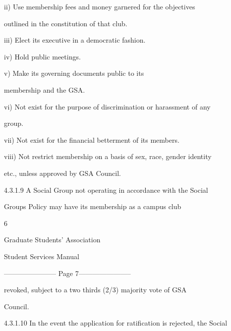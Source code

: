         ii)     Use membership fees and money garnered for the objectives  

                outlined in the constitution of that club.   



        iii)    Elect its executive in a democratic fashion.   



        iv)     Hold public meetings.   



        v)      Make       its   governing        documents        public     to    its  

                membership and the GSA.   



        vi)     Not exist for the purpose of discrimination or harassment of any  

                group.   



        vii)    Not exist for the financial betterment of its members.   



        viii)   Not restrict membership on a basis of sex, race, gender identity  

                etc., unless approved by GSA Council.   



4.3.1.9       A  Social  Group  not  operating  in  accordance  with  the  Social  

              Groups  Policy  may  have  its  membership  as  a  campus  club  



                                               6  



                                   Graduate Students’ Association  



                                        Student Services Manual  



  


----------------------- Page 7-----------------------

              revoked,  subject  to  a  two  thirds  (2/3)  majority  vote  of  GSA  

              Council.   



4.3.1.10      In the event the application for ratification is rejected, the  Social  

